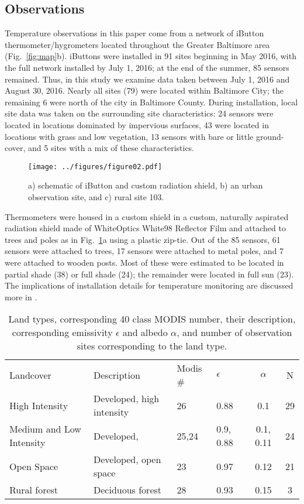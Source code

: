 \documentclass[draft,linenumbers]{agujournal}
\begin{document}
\subsection{Observations}
Temperature observations in this paper come from a network of iButton thermometer/hygrometers located throughout the Greater Baltimore area (Fig.~\ref{fig:map}b). 
iButtons were installed in 91 sites beginning in May 2016, with the full network installed by July 1, 2016; at the end of the summer, 85 sensors remained. Thus, in this study we examine data taken between July 1, 2016 and August 30, 2016. Nearly all sites (79) were located within Baltimore City; the remaining 6 were north of the city in Baltimore County. During installation, local site data was taken on the surrounding site characteristics: 24 sensors were located in locations dominated by impervious surfaces, 43 were located in locations with grass and low vegetation, 13 sensors with bare or little ground-cover, and 5 sites with a mix of these characteristics. 

 \begin{figure}
\centering
\texttt{[image: ../figures/figure02.pdf]}
\caption{a) schematic of iButton and custom radiation shield, b) an urban observation site, and c) rural site 103.}
\label{fig:ibutton}
 \end{figure}

Thermometers were housed in a custom shield in a custom, naturally aspirated radiation shield made of WhiteOptics White98 Reflector Film and attached to trees and poles as in Fig.~\ref{fig:ibutton}a using a plastic zip-tie. Out of the 85 sensors, 61 sensors were attached to trees, 17 sensors were attached to metal poles, and 7 were attached to wooden posts. Most of these were estimated to be located in partial shade (38) or full shade (24); the remainder were located in full sun (23). The implications of installation details for temperature monitoring are discussed more in \cite{scott2017intraurban}.

\begin{table}
\centering
\begin{tabular}{l l l l c c}
Landcover & Description &  Modis \# & $\epsilon$ & $\alpha$ & N  \\
High Intensity & Developed, high intensity & 26& 0.88 &0.1 & 29 \\
Medium and Low Intensity & Developed, & 25,24& 0.9, 0.88 & 0.1, 0.11& 24\\
Open Space& Developed, open space &23 & 0.97 & 0.12 & 21\\
Rural forest&Deciduous forest & 28& 0.93& 0.15& 3\\
\end{tabular}
\caption{Land types, corresponding 40 class MODIS number, their description, corresponding emissivity $\epsilon$ and albedo $\alpha$, and number of observation sites corresponding to the land type.}
\label{tab:lcc}
\end{table}
\end{document}
